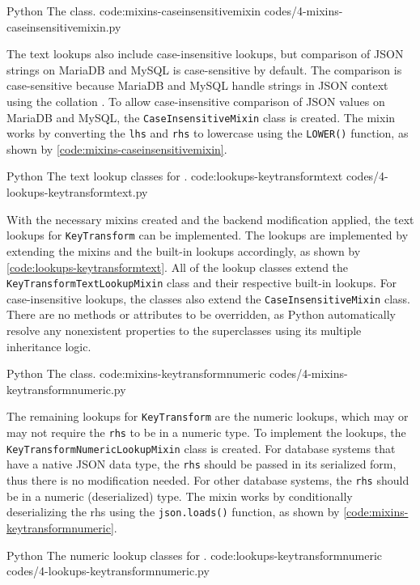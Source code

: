 \listing
{Python}
{The  class.}
{code:mixins-caseinsensitivemixin}
{codes/4-mixins-caseinsensitivemixin.py}

The text lookups also include case-insensitive lookups, but comparison of JSON
strings on MariaDB and MySQL is case-sensitive by default. The comparison is
case-sensitive because MariaDB and MySQL handle strings in JSON context using
the  collation \cite{mysql:json}. To allow case-insensitive
comparison of JSON values on MariaDB and MySQL, the \verb|CaseInsensitiveMixin|
class is created. The mixin works by converting the \verb|lhs| and \verb|rhs|
to lowercase using the \verb|LOWER()| function, as shown by
\autoref{code:mixins-caseinsensitivemixin}.

\listing
{Python}
{The text lookup classes for .}
{code:lookups-keytransformtext}
{codes/4-lookups-keytransformtext.py}

With the necessary mixins created and the backend modification applied, the
text lookups for \verb|KeyTransform| can be implemented. The lookups are
implemented by extending the mixins and the built-in lookups accordingly, as
shown by \autoref{code:lookups-keytransformtext}. All of the lookup classes
extend the \verb|KeyTransformTextLookupMixin| class and their respective
built-in lookups. For case-insensitive lookups, the classes also extend the
\verb|CaseInsensitiveMixin| class. There are no methods or attributes to be
overridden, as Python automatically resolve any nonexistent properties to the
superclasses using its multiple inheritance logic.

\listing
{Python}
{The  class.}
{code:mixins-keytransformnumeric}
{codes/4-mixins-keytransformnumeric.py}

The remaining lookups for \verb|KeyTransform| are the numeric lookups, which
may or may not require the \verb|rhs| to be in a numeric type. To implement
the lookups, the \verb|KeyTransformNumericLookupMixin| class is created. For
database systems that have a native JSON data type, the \verb|rhs| should be
passed in its serialized form, thus there is no modification needed. For other
database systems, the \verb|rhs| should be in a numeric (deserialized) type.
The mixin works by conditionally deserializing the rhs using the
\verb|json.loads()| function, as shown by
\autoref{code:mixins-keytransformnumeric}.

\listing
{Python}
{The numeric lookup classes for .}
{code:lookups-keytransformnumeric}
{codes/4-lookups-keytransformnumeric.py}

